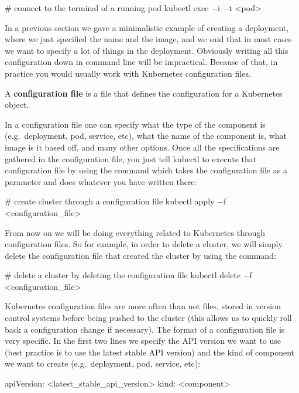 \begin{bash}
# connect to the terminal of a running pod
kubectl exec $-$i $-$t <pod>
\end{bash}

In a previous section we gave a minimalistic example of creating a deployment, where we just specified the name
and the image, and we said that in most cases we want to specify a lot of things in the deployment. Obviously writing
all this configuration down in command line will be impractical. Because of that, in practice you would usually work
with Kubernetes configuration files.

A \textbf{configuration file} is a file that defines the configuration for a Kubernetes object.
\ed

In a configuration file one can specify what the type of the component is (e.g.\ deployment, pod, service, etc), what
the name of the component is, what image is it based off, and many other options. Once all the specifications are
gathered in the configuration file, you just tell kubectl to execute that configuration file by using the
 command which takes the configuration file as a parameter and does whatever you have written there:

\begin{bash}
# create cluster through a configuration file
kubectl apply $-$f <configuration_file>
\end{bash}

From now on we will be doing everything related to Kubernetes through configuration files. So for example, in order
to delete a cluster, we will simply delete the configuration file that created the cluster by using the command:

\begin{bash}
# delete a cluster by deleting the configuration file
kubectl delete $-$f <configuration_file>
\end{bash}

Kubernetes configuration files are more often than not  files, stored in version control systems before
being pushed to the cluster (this allows us to quickly roll back a configuration change if necessary). The format of
a configuration file is very specific. In the first two lines we specify the API version we want to use (best
practice is to use the latest stable API version) and the kind of component we want to create (e.g.\ deployment, pod,
service, etc):

\begin{block}
apiVersion: <latest_stable_api_version>
kind: <component>
\end{block}

